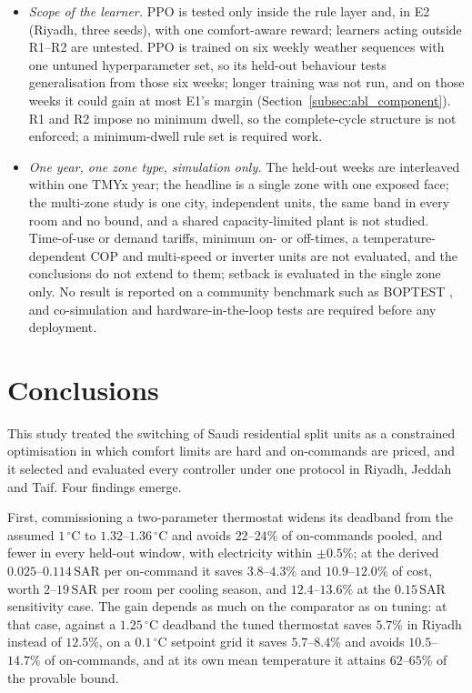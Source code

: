 \documentclass[pdflatex,sn-mathphys-num,iicol]{sn-jnl}
\theoremstyle{thmstyleone}\newtheorem{proposition}{Proposition}\newtheorem{corollary}{Corollary}
\theoremstyle{thmstyletwo}\newtheorem{remark}{Remark}\newtheorem{observation}{Observation}
\theoremstyle{thmstylethree}\newtheorem{definition}{Definition}
\newcommand{\SAR}{\text{SAR}}
\begin{document}
\begin{itemize}[leftmargin=*,itemsep=1pt,topsep=2pt]
\item \emph{Scope of the learner.} PPO is tested only inside the rule layer and,
in E2 (Riyadh, three seeds), with one comfort-aware reward; learners acting outside R1--R2 are untested. PPO is trained on six weekly weather sequences with one untuned hyperparameter set, so its held-out behaviour tests generalisation from those six weeks; longer training was not run, and on those weeks it could gain at most E1's margin (Section~\ref{subsec:abl_component}). R1 and R2 impose no minimum dwell, so the complete-cycle structure is not enforced; a minimum-dwell rule set is required work.
\item \emph{One year, one zone type, simulation only.} The held-out weeks are
interleaved within one TMYx year; the headline is a single zone with one exposed face; the multi-zone study is one city, independent units, the same band in every room and no bound, and a shared capacity-limited plant is not studied. Time-of-use or demand tariffs, minimum on- or off-times, a temperature-dependent COP and multi-speed or inverter units are not evaluated, and the conclusions do not extend to them; setback is evaluated in the single zone only. No result is reported on a community benchmark such as BOPTEST \citep{Blum2021}, and co-simulation and hardware-in-the-loop tests are required before any deployment.
\end{itemize}

\section{Conclusions}
\label{sec:conclusion}

This study treated the switching of Saudi residential split units as a constrained optimisation in which comfort limits are hard and on-commands are priced, and it selected and evaluated every controller under one protocol in Riyadh, Jeddah and Taif. Four findings emerge.

First, commissioning a two-parameter thermostat widens its deadband from the assumed $1\,^\circ$C to $1.32$--$1.36\,^\circ$C and avoids $22$--$24\%$ of on-commands pooled, and fewer in every held-out window, with electricity within $\pm0.5\%$; at the derived $0.025$--$0.114\,\SAR$ per on-command it saves $3.8$--$4.3\%$ and $10.9$--$12.0\%$ of cost, worth $2$--$19\,\SAR$ per room per cooling season, and $12.4$--$13.6\%$ at the $0.15\,\SAR$ sensitivity case. The gain depends as much on the comparator as on tuning: at that case, against a $1.25\,^\circ$C deadband the tuned thermostat saves $5.7\%$ in Riyadh instead of $12.5\%$, on a $0.1\,^\circ$C setpoint grid it saves $5.7$--$8.4\%$ and avoids $10.5$--$14.7\%$ of on-commands, and at its own mean temperature it attains $62$--$65\%$ of the provable bound.
\end{document}
